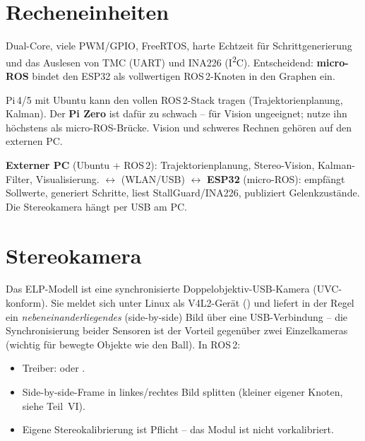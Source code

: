 \section{Recheneinheiten}
\begin{description}[style=nextline,leftmargin=1.4em]
\item[ESP32 (Motorebene)] Dual-Core, viele PWM/GPIO, FreeRTOS, harte Echtzeit
  für Schrittgenerierung und das Auslesen von TMC (UART) und INA226
  (I\textsuperscript{2}C). Entscheidend: \textbf{micro-ROS} bindet den ESP32
  als vollwertigen ROS\,2-Knoten in den Graphen ein.
\item[Raspberry Pi (High-Level)] Pi\,4/5 mit Ubuntu kann den vollen
  ROS\,2-Stack tragen (Trajektorienplanung, Kalman). Der \textbf{Pi Zero} ist
  dafür zu schwach -- für Vision ungeeignet; nutze ihn höchstens als
  micro-ROS-Brücke. Vision und schweres Rechnen gehören auf den externen PC.
\end{description}

\begin{infobox}[title=Empfohlene Arbeitsteilung]
\textbf{Externer PC} (Ubuntu + ROS\,2): Trajektorienplanung, Stereo-Vision,
Kalman-Filter, Visualisierung.
\;$\longleftrightarrow$\; (WLAN/USB) \;$\longleftrightarrow$\;
\textbf{ESP32} (micro-ROS): empfängt Sollwerte, generiert Schritte, liest
StallGuard/INA226, publiziert Gelenkzustände. Die Stereokamera hängt per USB
am PC.
\end{infobox}

\section{Stereokamera}
Das ELP-Modell ist eine synchronisierte Doppelobjektiv-USB-Kamera
(UVC-konform). Sie meldet sich unter Linux als V4L2-Gerät ()
und liefert in der Regel ein \emph{nebeneinanderliegendes} (side-by-side) Bild
über eine USB-Verbindung -- die Synchronisierung beider Sensoren ist der
Vorteil gegenüber zwei Einzelkameras (wichtig für bewegte Objekte wie den Ball).
In ROS\,2:
\begin{itemize}
\item Treiber:  oder .
\item Side-by-side-Frame in linkes/rechtes Bild splitten (kleiner eigener Knoten,
  siehe Teil~VI).
\item Eigene Stereokalibrierung ist Pflicht -- das Modul ist nicht vorkalibriert.
\end{itemize}
